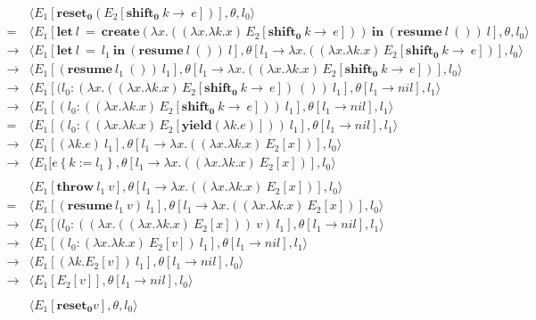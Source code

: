 \documentclass[a4j]{jsarticle}
\newcommand{\sbst}[2]{#1 \left\{ #2 \right\}}
\newcommand{\ra}{\rightarrow}
\newcommand{\app}[2]{\left(#1 \, #2\right)} %
\newcommand{\resume}[2]{\mathbf{resume}~ #1 ~#2}
\newcommand{\shift}[2]{\mathbf{shift_0}~ #1\ra ~#2}
\newcommand{\create}[1]{\mathbf{create}\left(#1\right)}
\newcommand{\letin}[3]{\mathbf{let}~#1~=~#2~\mathbf{in}~#3}
\newcommand{\yield}[1]{\mathbf{yield}\left(#1\right)}
\newcommand{\fun}[2]{\lambda #1. #2}
\newcommand{\throw}[2]{\mathbf{throw}~#1~#2}
\newcommand{\reset}{\mathbf{reset_0}}
\begin{document}
\begin{align*}
  & \langle E_1[\reset (E_2[\shift{k}{e}])], \theta, l_0\rangle \\
  =& \langle E_1[\letin{l}
     {\create{ \fun{x}{\app{(\fun{x}{\fun{k}{x}})}}{E_2[\shift{k}{e}]} } }
     {(\resume{l}{()})~l}],
     \theta,
     l_0\rangle \\
  \ra& \langle E_1[\letin{l}
       {l_1}
       {(\resume{l}{()})~l}],
       \theta[l_1\ra \lambda x.\app{(\fun{x}{\fun{k}{x}})}{E_2[\shift{k}{e}]}],
       l_0\rangle \\
  \ra& \langle E_1[(\resume{l_1}{()})~l_1],
       \theta[l_1\ra \lambda x.\app{(\fun{x}{\fun{k}{x}})}{E_2[\shift{k}{e}]}],
       l_0\rangle \\
  \ra& \langle E_1[(l_0: (\lambda x.\app{(\fun{x}{\fun{k}{x}})}{E_2[\shift{k}{e}]} ~()) ~l_1],
       \theta[l_1\ra nil],
       l_1\rangle \\
  \ra& \langle E_1[(l_0: \app{(\fun{x}{\fun{k}{x}})}{E_2[\shift{k}{e}]})~l_1],
       \theta[l_1\ra nil],
       l_1\rangle \\
  =&   \langle E_1[(l_0: \app{(\fun{x}{\fun{k}{x}})}{E_2[\yield{\fun{k}{e}}]})~l_1],
     \theta[l_1\ra nil],
     l_1\rangle \\
  \ra & \langle E_1[(\fun{k}{e})~l_1],
        \theta[l_1 \ra \lambda x.((\fun{x}{\fun{k}{x}}) ~ E_2[x])],
        l_0\rangle \\
  \ra & \langle E_1[\sbst{e}{k:=l_1}, \theta[l_1\ra \lambda x.((\fun{x}{\fun{k}{x})}~E_2[x])], l_0\rangle\\
  \\
  &\langle E_1[\throw{l_1}{v}], \theta[l_1\ra \lambda x.((\fun{x}{\fun{k}{x}})~E_2[x])], l_0\rangle \\
  =& \langle E_1[(\resume{l_1}{v})
     ~l_1
     ],
     \theta[l_1\ra \lambda x.((\fun{x}{\fun{k}{x}})~E_2[x])],
     l_0\rangle \\
  \ra & \langle E_1[(l_0 : ((\lambda x.((\fun{x}{\fun{k}{x}})~E_2[x]))~v)
        ~l_1
        ],
        \theta[l_1\ra nil],
        l_1\rangle \\
  \ra & \langle E_1[(l_0 : (\fun{x}{\fun{k}{x}})~E_2[v])
        ~l_1
        ],
        \theta[l_1\ra nil],
        l_1\rangle \\
  \ra & \langle E_1[(\fun{k}{E_2[v]})~l_1], \theta[l_1\ra nil], l_0\rangle \\
  \ra & \langle E_1[E_2[v]], \theta[l_1\ra nil], l_0\rangle \\
  \\
  &\langle E_1[\reset v], \theta, l_0\rangle \\

\end{align*}
\end{document}
